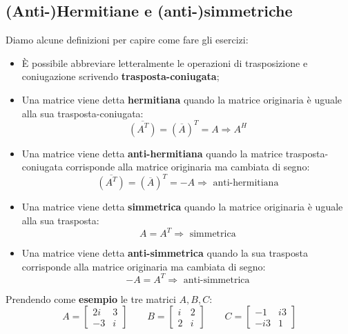 \documentclass[a4paper]{article}
\begin{document}
	\subsection{(Anti-)Hermitiane e (anti-)simmetriche}
	
	Diamo alcune definizioni per capire come fare gli esercizi:
	\begin{itemize}
		\item È possibile abbreviare letteralmente le operazioni di trasposizione e coniugazione scrivendo \textbf{trasposta-coniugata};
		
		\item Una matrice viene detta \textcolor{Red3}{\textbf{hermitiana}} quando la matrice originaria è uguale alla sua trasposta-coniugata:
		\begin{equation*}
			\overline{\left(A^{T}\right)} = \left(\overline{A}\right)^{T} = A \Longrightarrow A^{H}
		\end{equation*}
		
		\item Una matrice viene detta \textcolor{Red3}{\textbf{anti-hermitiana}} quando la matrice trasposta-coniugata corrisponde alla matrice originaria ma cambiata di segno:
		\begin{equation*}
			\overline{\left(A^{T}\right)} = \left(\overline{A}\right)^{T} = -A \Longrightarrow \text{ anti-hermitiana}
		\end{equation*}
		
		\item Una matrice viene detta \textcolor{Red3}{\textbf{simmetrica}} quando la matrice originaria è uguale alla sua trasposta:
		\begin{equation*}
			A = A^{T} \Longrightarrow \text{ simmetrica}
		\end{equation*}
		
		\item Una matrice viene detta \textcolor{Red3}{\textbf{anti-simmetrica}} quando la sua trasposta corrisponde alla matrice originaria ma cambiata di segno:
		\begin{equation*}
			-A = A^{T} \Longrightarrow \text{ anti-simmetrica}
		\end{equation*}
	\end{itemize}
	Prendendo come \textcolor{Green4}{\textbf{esempio}} le tre matrici $A,B,C$:
	\begin{equation*}
		A = \begin{bmatrix}
			2i 	& 3		\\
			-3	& i
		\end{bmatrix} \hspace{2em}
		B = \begin{bmatrix}
			i 	& 2		\\
			2	& i
		\end{bmatrix} \hspace{2em}
		C = \begin{bmatrix}
			-1 	& i3	\\
			-i3	& 1
		\end{bmatrix}
	\end{equation*}
\end{document}
